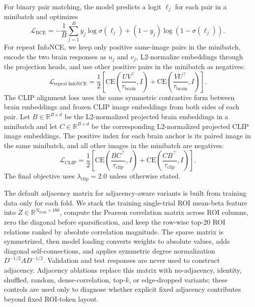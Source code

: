 \documentclass{article}
\begin{document}
For binary pair matching, the model predicts a logit $\ell_j$ for each pair in a minibatch and optimizes
\begin{equation}
  \mathcal{L}_{\mathrm{BCE}}
  = -\frac{1}{B}\sum_{j=1}^{B}
  y_j\log\sigma(\ell_j) + (1-y_j)\log(1-\sigma(\ell_j)).
\end{equation}
For repeat InfoNCE, we keep only positive same-image pairs in the minibatch, encode the two brain responses as $u_j$ and $v_j$, L2-normalize embeddings through the projection heads, and use other positive pairs in the minibatch as negatives:
\begin{equation}
  \mathcal{L}_{\mathrm{repeat\ InfoNCE}}
  = \frac{1}{2}\left[
  \mathrm{CE}\left(\frac{UV^\top}{\tau_{\mathrm{brain}}}, I\right)
  +
  \mathrm{CE}\left(\frac{VU^\top}{\tau_{\mathrm{brain}}}, I\right)
  \right].
\end{equation}
The CLIP alignment loss uses the same symmetric contrastive form between brain embeddings and frozen CLIP image embeddings from both sides of each pair. Let $B\in\mathbb{R}^{B\times d}$ be the L2-normalized projected brain embeddings in a minibatch and let $C\in\mathbb{R}^{B\times d}$ be the corresponding L2-normalized projected CLIP image embeddings. The positive index for each brain anchor is its paired image in the same minibatch, and all other images in the minibatch are negatives:
\begin{equation}
  \mathcal{L}_{\mathrm{CLIP}}
  = \frac{1}{2}\left[
  \mathrm{CE}\left(\frac{BC^\top}{\tau_{\mathrm{clip}}}, I\right)
  +
  \mathrm{CE}\left(\frac{CB^\top}{\tau_{\mathrm{clip}}}, I\right)
  \right].
\end{equation}
The final objective uses $\lambda_{\mathrm{clip}}=2.0$ unless otherwise stated.

The default adjacency matrix for adjacency-aware variants is built from training data only for each fold. We stack the training single-trial ROI mean-beta feature into $Z\in\mathbb{R}^{N_{\mathrm{train}}\times180}$, compute the Pearson correlation matrix across ROI columns, zero the diagonal before sparsification, and keep the row-wise top-20 ROI relations ranked by absolute correlation magnitude. The sparse matrix is symmetrized, then model loading converts weights to absolute values, adds diagonal self-connections, and applies symmetric degree normalization $D^{-1/2}AD^{-1/2}$. Validation and test responses are never used to construct adjacency. Adjacency ablations replace this matrix with no-adjacency, identity, shuffled, random, dense-correlation, top-$k$, or edge-dropped variants; these controls are used only to diagnose whether explicit fixed adjacency contributes beyond fixed ROI-token layout.
\end{document}
